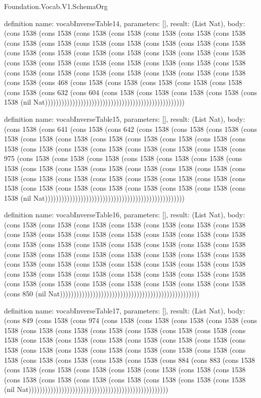 \begin{lexlean}{Foundation.Vocab.V1.SchemaOrg}
\begin{semanticmodule}
definition{
  name: vocabInverseTable14,
  parameters: [],
  result: (List Nat),
  body: (cons 1538 (cons 1538 (cons 1538 (cons 1538 (cons 1538 (cons 1538 (cons 1538 (cons 1538 (cons 1538 (cons 1538 (cons 1538 (cons 1538 (cons 1538 (cons 1538 (cons 1538 (cons 1538 (cons 1538 (cons 1538 (cons 1538 (cons 1538 (cons 1538 (cons 1538 (cons 1538 (cons 1538 (cons 1538 (cons 1538 (cons 1538 (cons 1538 (cons 1538 (cons 1538 (cons 1538 (cons 1538 (cons 1538 (cons 1538 (cons 1538 (cons 1538 (cons 468 (cons 1538 (cons 1538 (cons 1538 (cons 1538 (cons 1538 (cons 1538 (cons 632 (cons 604 (cons 1538 (cons 1538 (cons 1538 (cons 1538 (cons 1538 (nil Nat)))))))))))))))))))))))))))))))))))))))))))))))))))
}

definition{
  name: vocabInverseTable15,
  parameters: [],
  result: (List Nat),
  body: (cons 1538 (cons 641 (cons 1538 (cons 642 (cons 1538 (cons 1538 (cons 1538 (cons 1538 (cons 1538 (cons 1538 (cons 1538 (cons 1538 (cons 1538 (cons 1538 (cons 1538 (cons 1538 (cons 1538 (cons 1538 (cons 1538 (cons 1538 (cons 1538 (cons 975 (cons 1538 (cons 1538 (cons 1538 (cons 1538 (cons 1538 (cons 1538 (cons 1538 (cons 1538 (cons 1538 (cons 1538 (cons 1538 (cons 1538 (cons 1538 (cons 1538 (cons 1538 (cons 1538 (cons 1538 (cons 1538 (cons 1538 (cons 1538 (cons 1538 (cons 1538 (cons 1538 (cons 1538 (cons 1538 (cons 1538 (cons 1538 (cons 1538 (nil Nat)))))))))))))))))))))))))))))))))))))))))))))))))))
}

definition{
  name: vocabInverseTable16,
  parameters: [],
  result: (List Nat),
  body: (cons 1538 (cons 1538 (cons 1538 (cons 1538 (cons 1538 (cons 1538 (cons 1538 (cons 1538 (cons 1538 (cons 1538 (cons 1538 (cons 1538 (cons 1538 (cons 1538 (cons 1538 (cons 1538 (cons 1538 (cons 1538 (cons 1538 (cons 1538 (cons 1538 (cons 1538 (cons 1538 (cons 1538 (cons 1538 (cons 1538 (cons 1538 (cons 1538 (cons 1538 (cons 1538 (cons 1538 (cons 1538 (cons 1538 (cons 1538 (cons 1538 (cons 1538 (cons 1538 (cons 1538 (cons 1538 (cons 1538 (cons 1538 (cons 1538 (cons 1538 (cons 1538 (cons 1538 (cons 1538 (cons 1538 (cons 1538 (cons 1538 (cons 850 (nil Nat)))))))))))))))))))))))))))))))))))))))))))))))))))
}

definition{
  name: vocabInverseTable17,
  parameters: [],
  result: (List Nat),
  body: (cons 849 (cons 1538 (cons 974 (cons 1538 (cons 1538 (cons 1538 (cons 1538 (cons 1538 (cons 1538 (cons 1538 (cons 1538 (cons 1538 (cons 1538 (cons 1538 (cons 1538 (cons 1538 (cons 1538 (cons 1538 (cons 1538 (cons 1538 (cons 1538 (cons 1538 (cons 1538 (cons 1538 (cons 1538 (cons 1538 (cons 1538 (cons 1538 (cons 1538 (cons 1538 (cons 1538 (cons 1538 (cons 1538 (cons 884 (cons 883 (cons 1538 (cons 1538 (cons 1538 (cons 1538 (cons 1538 (cons 1538 (cons 1538 (cons 1538 (cons 1538 (cons 1538 (cons 1538 (cons 1538 (cons 1538 (cons 1538 (cons 1538 (nil Nat)))))))))))))))))))))))))))))))))))))))))))))))))))
}


\end{semanticmodule}
\end{lexlean}
